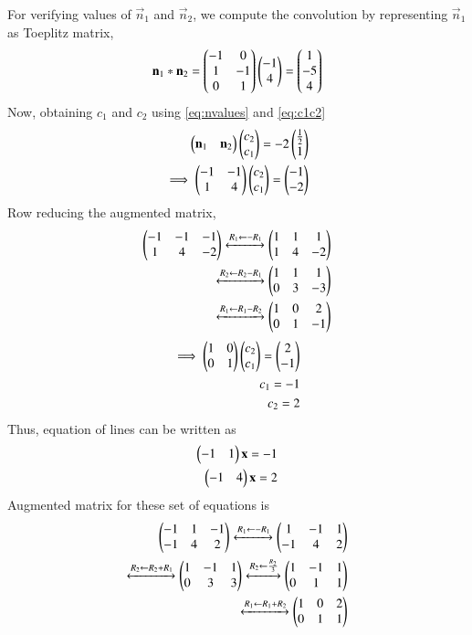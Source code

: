 \documentclass[journal,12pt,twocolumn]{IEEEtran}
\begin{document}
For verifying values of $\vec{n}_1$ and $\vec{n}_2$, we compute the convolution by representing $\vec{n}_1$ as Toeplitz matrix,
\begin{align}
    \mathbf{n}_1*\mathbf{n}_2=\begin{pmatrix}-1 & 0 \\ 1 & -1 \\ 0 & 1\end{pmatrix}\begin{pmatrix}-1 \\ 4\end{pmatrix} = \begin{pmatrix}1 \\ -5 \\ 4\end{pmatrix}
\end{align}
Now, obtaining $c_1$ and $c_2$ using \eqref{eq:nvalues} and \eqref{eq:c1c2}
\begin{align}
    \begin{pmatrix}\mathbf{n}_1 & \mathbf{n}_2\end{pmatrix}\begin{pmatrix}c_2 \\ c_1\end{pmatrix} = -2\begin{pmatrix}\frac{1}{2} \\ 1\end{pmatrix}\\
    \implies \begin{pmatrix}-1 & -1 \\ 1 & 4\end{pmatrix}\begin{pmatrix}c_2 \\ c_1\end{pmatrix} = \begin{pmatrix}-1 \\ -2\end{pmatrix}
\end{align}
Row reducing the augmented matrix,
\begin{align}
    \begin{pmatrix}-1 & -1 & -1 \\ 1 & 4 & -2\end{pmatrix} \xleftrightarrow{R_1 \leftarrow -R_1}\begin{pmatrix}1 & 1 & 1 \\ 1 & 4 & -2\end{pmatrix}\\\xleftrightarrow{R_2\leftarrow R_2-R_1}\begin{pmatrix}1 & 1 & 1 \\ 0 & 3 & -3\end{pmatrix}\\
    \xleftrightarrow{R_1\leftarrow R_1-R_2}\begin{pmatrix}1 & 0 & 2 \\ 0 & 1 & -1\end{pmatrix}
\end{align}
\begin{align}
    \implies \begin{pmatrix}1 & 0 \\ 0 & 1\end{pmatrix}\begin{pmatrix}c_2 \\ c_1\end{pmatrix} = \begin{pmatrix}2 \\ -1\end{pmatrix}\nonumber\\
    c_1 = -1\\
    c_2 = 2\label{eq:cvalues}
\end{align}
Thus, equation of lines can be written as
\begin{align}
    \begin{pmatrix}-1 & 1\end{pmatrix}\mathbf{x} = -1\\
    \begin{pmatrix}-1 & 4\end{pmatrix}\mathbf{x} = 2
\end{align}
Augmented matrix for these set of equations is
\begin{align}
    \begin{pmatrix}-1 & 1 & -1 \\ -1 & 4 & 2\end{pmatrix}\xleftrightarrow{R_1\leftarrow -R_1}\begin{pmatrix}1 & -1 & 1 \\ -1 & 4 & 2\end{pmatrix}\\\xleftrightarrow{R_2\leftarrow R_2+R_1}\begin{pmatrix}1 & -1 & 1 \\ 0 & 3 & 3\end{pmatrix}
    \xleftrightarrow{R_2\leftarrow \frac{R_2}{3}}\begin{pmatrix}1 & -1 & 1 \\ 0 & 1 & 1\end{pmatrix}\\\xleftrightarrow{R_1\leftarrow R_1+R_2}\begin{pmatrix}1 & 0 & 2 \\ 0 & 1 & 1\end{pmatrix}
\end{align}
\end{document}
